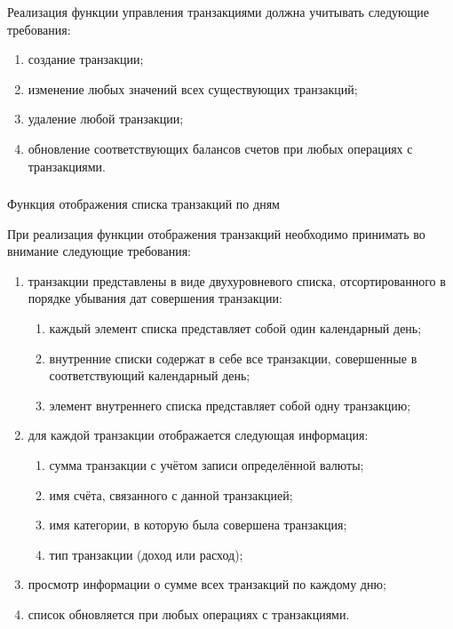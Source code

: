Реализация функции управления транзакциями должна учитывать следующие требования:

\begin{enumerate}
    \item создание транзакции;
    \item изменение любых значений всех существующих транзакций;
    \item удаление любой транзакции;
    \item обновление соответствующих балансов счетов при любых операциях с транзакциями.
\end{enumerate}

\subsubsection{} Функция отображения списка транзакций по дням
\label{sec:domain:specification:transactions_list}

При реализация функции отображения транзакций необходимо принимать во внимание следующие требования:

\begin{enumerate}
    \item транзакции представлены в виде двухуровневого списка, отсортированного в порядке убывания дат совершения транзакции:
    \begin{enumerate}
        \item каждый элемент списка представляет собой один календарный день;
        \item внутренние списки содержат в себе все транзакции, совершенные в соответствующий календарный день;
        \item элемент внутреннего списка представляет собой одну транзакцию;
    \end{enumerate}
    \item для каждой транзакции отображается следующая информация:
    \begin{enumerate}
        \item сумма транзакции с учётом записи определённой валюты;
        \item имя счёта, связанного с данной транзакцией;
        \item имя категории, в которую была совершена транзакция;
        \item тип транзакции (доход или расход);
    \end{enumerate}
    \item просмотр информации о сумме всех транзакций по каждому дню;
    \item список обновляется при любых операциях с транзакциями.
\end{enumerate}
